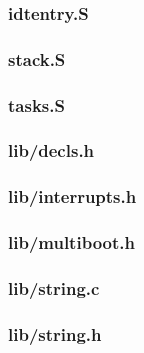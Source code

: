 \documentclass[a4paper]{article}
\begin{document}
\subsubsection{idtentry.S}

\subsubsection{stack.S}

\subsubsection{tasks.S}


\subsubsection{lib/decls.h}

\subsubsection{lib/interrupts.h}

\subsubsection{lib/multiboot.h}

\subsubsection{lib/string.c}

\subsubsection{lib/string.h}

\end{document}
